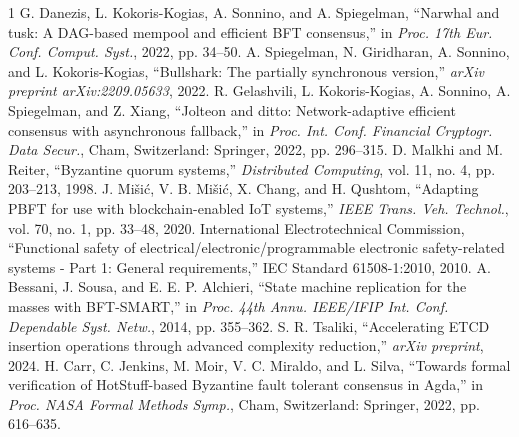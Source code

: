 \documentclass[manuscript,screen,review]{acmart}
\begin{document}
\begin{thebibliography}{1}
G. Danezis, L. Kokoris-Kogias, A. Sonnino, and A. Spiegelman, ``Narwhal and tusk: A DAG-based mempool and efficient BFT consensus,'' in \textit{Proc. 17th Eur. Conf. Comput. Syst.}, 2022, pp. 34--50.
A. Spiegelman, N. Giridharan, A. Sonnino, and L. Kokoris-Kogias, ``Bullshark: The partially synchronous version,'' \textit{arXiv preprint arXiv:2209.05633}, 2022.
R. Gelashvili, L. Kokoris-Kogias, A. Sonnino, A. Spiegelman, and Z. Xiang, ``Jolteon and ditto: Network-adaptive efficient consensus with asynchronous fallback,'' in \textit{Proc. Int. Conf. Financial Cryptogr. Data Secur.}, Cham, Switzerland: Springer, 2022, pp. 296--315.
D. Malkhi and M. Reiter, ``Byzantine quorum systems,'' \textit{Distributed Computing}, vol. 11, no. 4, pp. 203--213, 1998.
J. Mi\v{s}i\'c, V. B. Mi\v{s}i\'c, X. Chang, and H. Qushtom, ``Adapting PBFT for use with blockchain-enabled IoT systems,'' \textit{IEEE Trans. Veh. Technol.}, vol. 70, no. 1, pp. 33--48, 2020.
International Electrotechnical Commission, ``Functional safety of electrical/electronic/programmable electronic safety-related systems - Part 1: General requirements,'' IEC Standard 61508-1:2010, 2010.
A. Bessani, J. Sousa, and E. E. P. Alchieri, ``State machine replication for the masses with BFT-SMART,'' in \textit{Proc. 44th Annu. IEEE/IFIP Int. Conf. Dependable Syst. Netw.}, 2014, pp. 355--362.
S. R. Tsaliki, ``Accelerating ETCD insertion operations through advanced complexity reduction,'' \textit{arXiv preprint}, 2024.
H. Carr, C. Jenkins, M. Moir, V. C. Miraldo, and L. Silva, ``Towards formal verification of HotStuff-based Byzantine fault tolerant consensus in Agda,'' in \textit{Proc. NASA Formal Methods Symp.}, Cham, Switzerland: Springer, 2022, pp. 616--635.
\end{thebibliography}
\end{document}
